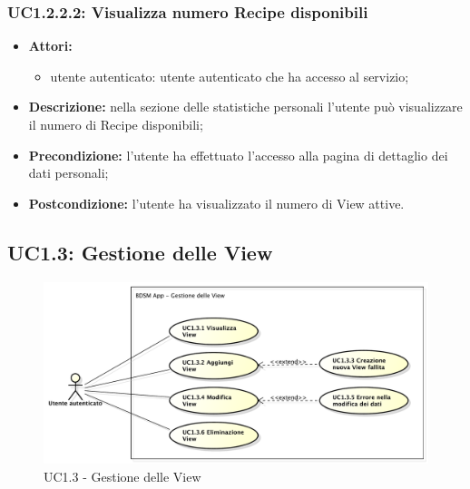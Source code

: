 \subsubsection{UC1.2.2.2: Visualizza numero Recipe disponibili}

\begin{itemize}
	\item \textbf{Attori:}
	\begin{itemize}
		\item utente autenticato: utente autenticato che ha accesso al servizio;
	\end{itemize}
	\item \textbf{Descrizione:} nella sezione delle statistiche personali l'utente può visualizzare il numero di Recipe disponibili;
	\item \textbf{Precondizione:} l'utente ha effettuato l'accesso alla pagina di dettaglio dei dati personali;
	\item \textbf{Postcondizione:} l'utente ha visualizzato il numero di View attive.
\end{itemize}


\pagebreak
\subsection{UC1.3: Gestione delle View}

\begin{figure}[!htbp]
	\centering
	\centerline{\includegraphics[scale=0.45]{./images/UC1_3.pdf}} %
	\caption{UC1.3 - Gestione delle View}
\end{figure}

